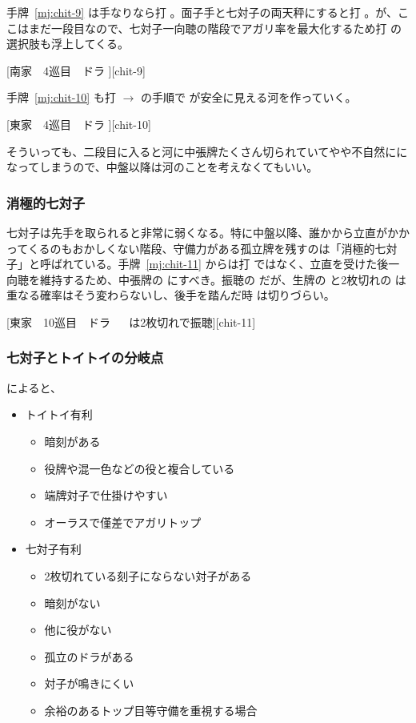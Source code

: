 \documentclass[../nankiru_main.tex]{subfiles}
\begin{document}
手牌~\ref{mj:chit-9} は手なりなら打 。面子手と七対子の両天秤にすると打 。が、ここはまだ一段目なので、七対子一向聴の階段でアガリ率を最大化するため打  の選択肢も浮上してくる\citep[][pp.~84--85]{zero-teyaku}。

[南家　4巡目　ドラ ][chit-9]

手牌~\ref{mj:chit-10} も打  $\to$  の手順で  が安全に見える河を作っていく。

[東家　4巡目　ドラ ][chit-10]

そういっても、二段目に入ると河に中張牌たくさん切られていてやや不自然にになってしまうので、中盤以降は河のことを考えなくてもいい。


\subsubsection*{消極的七対子}

七対子は先手を取られると非常に弱くなる。特に中盤以降、誰かから立直がかかってくるのもおかしくない階段、守備力がある孤立牌を残すのは「消極的七対子」と呼ばれている。手牌~\ref{mj:chit-11} からは打  ではなく、立直を受けた後一向聴を維持するため、中張牌の  にすべき。振聴の  だが、生牌の  と2枚切れの  は重なる確率はそう変わらないし、後手を踏んだ時  は切りづらい\citep[][p.~85]{zero-teyaku}。

[東家　10巡目　ドラ 　 は2枚切れで振聴][chit-11]


\subsubsection*{七対子とトイトイの分岐点}

\citet{gendai-toitoi}によると、

\begin{itemize}
  \item トイトイ有利
  \begin{itemize}
    \item 暗刻がある
    \item 役牌や混一色などの役と複合している
    \item 端牌対子で仕掛けやすい
    \item オーラスで僅差でアガリトップ
  \end{itemize}
  \item 七対子有利
  \begin{itemize}
    \item 2枚切れている刻子にならない対子がある
    \item 暗刻がない
    \item 他に役がない
    \item 孤立のドラがある
    \item 対子が鳴きにくい
    \item 余裕のあるトップ目等守備を重視する場合
  \end{itemize}
\end{itemize}
\end{document}
